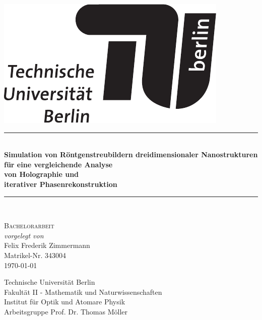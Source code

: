 \begin{titlepage}
	
	\begin{center}
		
		
		\begin{flushright}
			\includegraphics[width=.3\textwidth]{images/TU_Logo.pdf}\\[2.5cm]    
		\end{flushright}
		
		
		{\newcommand{\HRule}{\rule{\linewidth}{0.5mm}}
			\HRule \\[0.4cm]
			\huge{\bfseries Simulation von Röntgenstreubildern dreidimensionaler Nanostrukturen\\ für eine vergleichende Analyse\\ von Holographie und \\iterativer Phasenrekonstruktion}\\
			
			\HRule \\[1.5cm]}
		\textsc{\Large Bachelorarbeit}\\[0.5cm]
		
		\emph{vorgelegt von}\\
		Felix Frederik Zimmermann\\
		Matrikel-Nr. 343004\\[0.5cm]
		{\large \today}
		
		
		\vfill
		
		Technische Universität Berlin\\
		Fakultät II - Mathematik und Naturwissenschaften\\
		Institut für Optik und Atomare Physik\\
		Arbeitsgruppe Prof. Dr. Thomas Möller\\
		
	\end{center}
	
\end{titlepage}